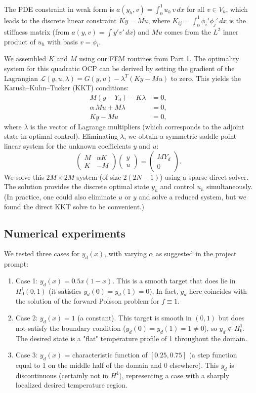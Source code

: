 \documentclass[a4paper,10pt]{article}
\begin{document}
The PDE constraint in weak form is $a(y_h,v) = \int_0^1 u_h\,v\,dx$ for all $v\in V_h$, which leads to the discrete linear constraint $Ky = Mu$, where $K_{ij}=\int_0^1 \phi_i'\phi_j'\,dx$ is the stiffness matrix (from $a(y,v)=\int y'v'\,dx$) and $Mu$ comes from the $L^2$ inner product of $u_h$ with basis $v=\phi_i$.

We assembled $K$ and $M$ using our FEM routines from Part 1. The optimality system for this quadratic OCP can be derived by setting the gradient of the Lagrangian $\mathcal{L}(y,u,\lambda) = G(y,u) - \lambda^T(Ky - Mu)$ to zero. This yields the Karush–Kuhn–Tucker (KKT) conditions:
\begin{align*}
	M(y-Y_d) - K\lambda   & = 0, \\
	\alpha\,Mu + M\lambda & = 0, \\
	Ky-Mu                 & = 0,
\end{align*}
where $\lambda$ is the vector of Lagrange multipliers (which corresponds to the adjoint state in optimal control). Eliminating $\lambda$, we obtain a symmetric saddle-point linear system for the unknown coefficients $y$ and $u$:
\[
	\begin{pmatrix}
		M & \alpha K \\
		K & -M
	\end{pmatrix}
	\begin{pmatrix}
		y \\
		u
	\end{pmatrix}
	=
	\begin{pmatrix}
		MY_d \\
		0
	\end{pmatrix}.
\]
We solve this $2M \times 2M$ system (of size $2(2N-1)$) using a sparse direct solver. The solution provides the discrete optimal state $y_h$ and control $u_h$ simultaneously. (In practice, one could also eliminate $u$ or $y$ and solve a reduced system, but we found the direct KKT solve to be convenient.)

\subsection{Numerical experiments} We tested three cases for $y_d(x)$, with varying $\alpha$ as suggested in the project prompt:

\begin{enumerate}
	\item Case 1: $y_d(x) = 0.5x(1-x)$. This is a smooth target that does lie in $H^1_0(0,1)$ (it satisfies $y_d(0)=y_d(1)=0$). In fact, $y_d$ here coincides with the solution of the forward Poisson problem for $f\equiv 1$.
	\item Case 2: $y_d(x) = 1$ (a constant). This target is smooth in $(0,1)$ but does not satisfy the boundary condition ($y_d(0)=y_d(1)=1\neq0$), so $y_d\notin H^1_0$. The desired state is a "flat" temperature profile of 1 throughout the domain.
	\item Case 3: $y_d(x)$ = characteristic function of $[0.25,0.75]$ (a step function equal to 1 on the middle half of the domain and 0 elsewhere). This $y_d$ is discontinuous (certainly not in $H^1$), representing a case with a sharply localized desired temperature region.
\end{enumerate}
\end{document}
